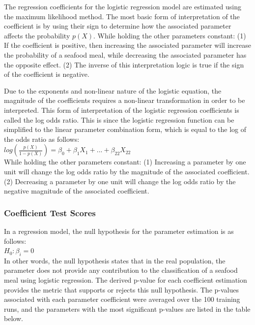 \documentclass{article}
\begin{document}
The regression coefficients for the logistic regression model are estimated using the maximum likelihood method. The most basic form of interpretation of the coefficient is by using their sign to determine how the associated parameter affects the probability $p(X)$. While holding the other parameters constant: (1) If the coefficient is positive, then increasing the associated parameter will increase the probability of a seafood meal, while decreasing the associated parameter has the opposite effect. (2) The inverse of this interpretation logic is true if the sign of the coefficient is negative.

Due to the exponents and non-linear nature of the logistic equation, the magnitude of the coefficients requires a non-linear transformation in order to be interpreted. This form of interpretation of the logistic regression coefficients is called the log odds ratio. This is since the logistic regression function can be simplified to the linear parameter combination form, which is equal to the log of the odds ratio as follows:\\

$log(\frac{p(X)}{1 - p(X)}) = \beta_0 + \beta_1X_1 + ... + \beta_{22}X_{22}$\\

While holding the other parameters constant: (1) Increasing a parameter by one unit will change the log odds ratio by the magnitude of the associated coefficient. (2) Decreasing a parameter by one unit will change the log odds ratio by the negative magnitude of the associated coefficient. 

\subsubsection{Coefficient Test Scores}
\label{sssec:subsubhead}

In a regression model, the null hypothesis for the parameter estimation is as follows:\\

$H_0: \beta_i = 0$\\

In other words, the null hypothesis states that in the real population, the parameter does not provide any contribution to the classification of a seafood meal using logistic regression. The derived p-value for each coefficient estimation provides the metric that supports or rejects this null hypothesis. The p-values associated with each parameter coefficient were averaged over the 100 training runs, and the parameters with the most significant p-values are listed in the table below.\\
\end{document}
